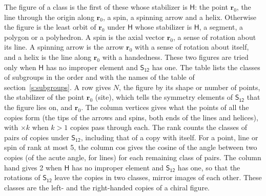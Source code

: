\documentclass[10pt,a4paper]{article}
\numberwithin{equation}{section}
\newcommand{\grp}[1]{\mathsf{#1}}
\newcommand{\pointr}{\mathbf{r}}
\begin{document}
\leavevmode\label{n:head.figure}The figure of a class is the first of these whose stabilizer is $\grp{H}$: the point $\pointr_0$, the line through the origin along $\pointr_0$, a spin, a spinning arrow and a helix. Otherwise the figure is the least orbit of $\pointr_0$ under $\grp{H}$ whose stabilizer is $\grp{H}$, a segment, a polygon or a polyhedron. A spin is the axial vector $\pointr_0$, a sense of rotation about its line. A spinning arrow is the arrow $\pointr_0$ with a sense of rotation about itself, and a helix is the line along $\pointr_0$ with a handedness. These two figures are tried only when $\grp{H}$ has no improper element and $\grp{S_{12}}$ has one. The table lists the classes of subgroups in the order and with the names of the table of section~\ref{s:subgroups}. \label{n:head.site}A row gives $N$, the figure by its shape or number of points, the stabilizer of the point $\pointr_0$ (site), which tells the symmetry elements of $\grp{S_{12}}$ that the figure lies on, and $\pointr_0$. \label{n:head.vertices}The column vertices gives what the points of all the copies form (the tips of the arrows and spins, both ends of the lines and helices), with ${\times}k$ when $k > 1$ copies pass through each. \label{n:head.rank}The rank counts the classes of pairs of copies under $\grp{S_{12}}$, including that of a copy with itself. \label{n:head.cos}For a point, line or spin of rank at most 5, the column cos gives the cosine of the angle between two copies (of the acute angle, for lines) for each remaining class of pairs. \label{n:head.hand}The column hand gives 2 when $\grp{H}$ has no improper element and $\grp{S_{12}}$ has one, so that the rotations of $\grp{S_{12}}$ leave the copies in two classes, mirror images of each other. These classes are the left- and the right-handed copies of a chiral figure.
\end{document}

